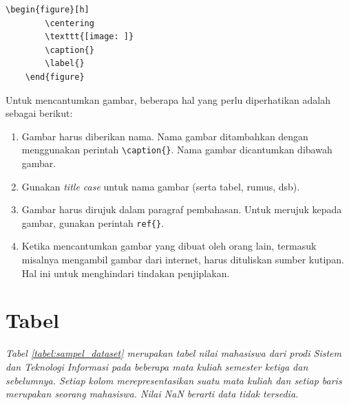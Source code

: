 \begin{lstlisting}[caption={Kode Latex untuk mencantumkan gambar}]
    \begin{figure}[h]
        \centering
      	\texttt{[image: ]}
      	\caption{}
      	\label{}
    \end{figure}
\end{lstlisting}

Untuk mencantumkan gambar, beberapa hal yang perlu diperhatikan adalah sebagai berikut:

\begin{enumerate}
    \item Gambar harus diberikan nama. Nama gambar ditambahkan dengan menggunakan perintah \verb|\caption{}|. Nama gambar dicantumkan dibawah gambar.
    \item Gunakan \textit{title case} untuk nama gambar (serta tabel, rumus, dsb).
    \item Gambar harus dirujuk dalam paragraf pembahasan. Untuk merujuk kepada gambar, gunakan perintah \verb|ref{}|. 
    \item Ketika mencantumkan gambar yang dibuat oleh orang lain, termasuk misalnya mengambil gambar dari internet, harus dituliskan sumber kutipan. Hal ini untuk menghindari tindakan penjiplakan. 
\end{enumerate}

\section{Tabel}

\textit{Tabel \ref{tabel:sampel_dataset} merupakan tabel nilai mahasiswa dari prodi Sistem dan Teknologi Informasi pada beberapa mata kuliah semester ketiga dan sebelumnya. Setiap kolom merepresentasikan suatu mata kuliah dan setiap baris merupakan seorang mahasiswa. Nilai NaN berarti data tidak tersedia.}

